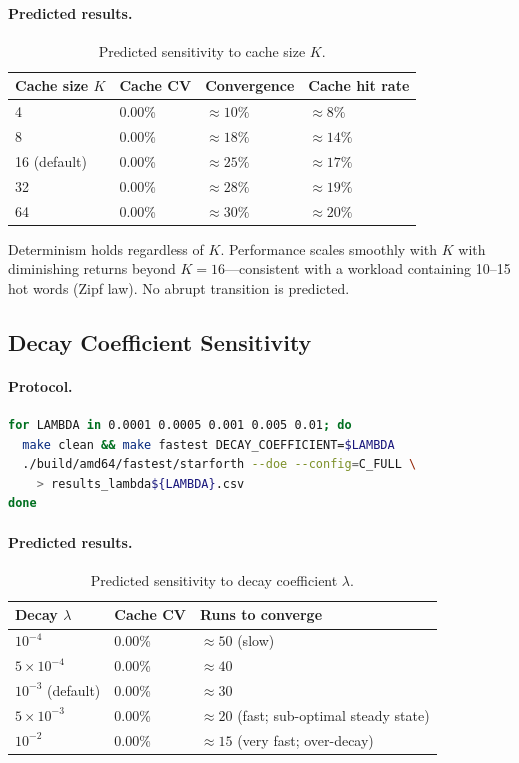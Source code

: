 \paragraph{Predicted results.}
\begin{table}[h]
\centering
\caption{Predicted sensitivity to cache size $K$.}
\begin{tabular}{llll}
\toprule
\textbf{Cache size $K$} & \textbf{Cache CV} & \textbf{Convergence} & \textbf{Cache hit rate} \\
\midrule
4 & 0.00\% & $\approx 10\%$ & $\approx 8\%$ \\
8 & 0.00\% & $\approx 18\%$ & $\approx 14\%$ \\
16 (default) & 0.00\% & $\approx 25\%$ & $\approx 17\%$ \\
32 & 0.00\% & $\approx 28\%$ & $\approx 19\%$ \\
64 & 0.00\% & $\approx 30\%$ & $\approx 20\%$ \\
\bottomrule
\end{tabular}
\end{table}

Determinism holds regardless of $K$. Performance scales smoothly with $K$ with
diminishing returns beyond $K = 16$---consistent with a workload containing
10--15 hot words (Zipf law). No abrupt transition is predicted.

\subsection{Decay Coefficient Sensitivity}

\paragraph{Protocol.}
\begin{lstlisting}[language=bash]
for LAMBDA in 0.0001 0.0005 0.001 0.005 0.01; do
  make clean && make fastest DECAY_COEFFICIENT=$LAMBDA
  ./build/amd64/fastest/starforth --doe --config=C_FULL \
    > results_lambda${LAMBDA}.csv
done
\end{lstlisting}

\paragraph{Predicted results.}
\begin{table}[h]
\centering
\caption{Predicted sensitivity to decay coefficient $\lambda$.}
\begin{tabular}{lll}
\toprule
\textbf{Decay $\lambda$} & \textbf{Cache CV} & \textbf{Runs to converge} \\
\midrule
$10^{-4}$ & 0.00\% & $\approx 50$ (slow) \\
$5 \times 10^{-4}$ & 0.00\% & $\approx 40$ \\
$10^{-3}$ (default) & 0.00\% & $\approx 30$ \\
$5 \times 10^{-3}$ & 0.00\% & $\approx 20$ (fast; sub-optimal steady state) \\
$10^{-2}$ & 0.00\% & $\approx 15$ (very fast; over-decay) \\
\bottomrule
\end{tabular}
\end{table}

